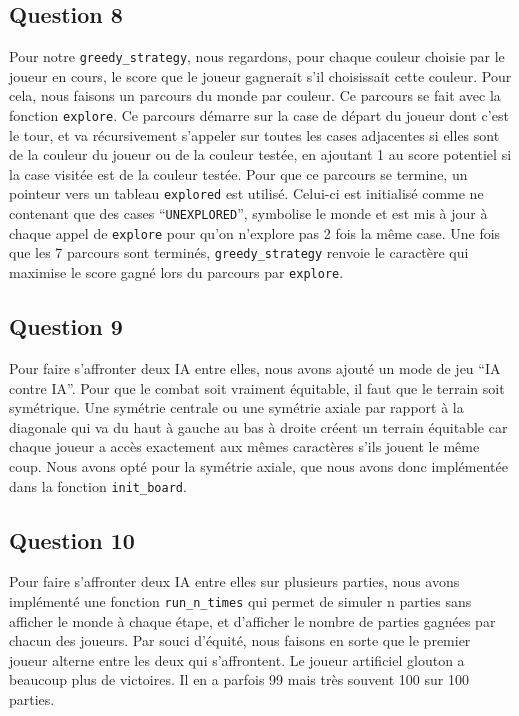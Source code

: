 \documentclass{article}
\begin{document}
\subsection{Question 8}
    Pour notre \texttt{greedy\_strategy}, nous regardons, pour chaque couleur choisie par le joueur en cours, le score que le joueur gagnerait s'il choisissait cette couleur. Pour cela, nous faisons un parcours du monde par couleur. Ce parcours se fait avec la fonction \texttt{explore}. Ce parcours démarre sur la case de départ du joueur dont c'est le tour, et va récursivement s'appeler sur toutes les cases adjacentes si elles sont de la couleur du joueur ou de la couleur testée, en ajoutant 1 au score potentiel si la case visitée est de la couleur testée. Pour que ce parcours se termine, un pointeur vers un tableau \texttt{explored} est utilisé. Celui-ci est initialisé comme ne contenant que des cases \enquote{\texttt{UNEXPLORED}}, symbolise le monde et est mis à jour à chaque appel de \texttt{explore} pour qu'on n'explore pas 2 fois la même case. Une fois que les 7 parcours sont terminés, \texttt{greedy\_strategy} renvoie le caractère qui maximise le score gagné lors du parcours par \texttt{explore}.
\subsection{Question 9}
    Pour faire s'affronter deux IA entre elles, nous avons ajouté un mode de jeu \enquote{IA contre IA}. Pour que le combat soit vraiment équitable, il faut que le terrain soit symétrique. Une symétrie centrale ou une symétrie axiale par rapport à la diagonale qui va du haut à gauche au bas à droite créent un terrain équitable car chaque joueur a accès exactement aux mêmes caractères s'ils jouent le même coup. Nous avons opté pour la symétrie axiale, que nous avons donc implémentée dans la fonction \texttt{init\_board}.
\subsection{Question 10}
    Pour faire s'affronter deux IA entre elles sur plusieurs parties, nous avons implémenté une fonction \texttt{run\_n\_times} qui permet de simuler n parties sans afficher le monde à chaque étape, et d'afficher le nombre de parties gagnées par chacun des joueurs. Par souci d'équité, nous faisons en sorte que le premier joueur alterne entre les deux qui s'affrontent. Le joueur artificiel glouton a beaucoup plus de victoires. Il en a parfois 99 mais très souvent 100 sur 100 parties.
\end{document}
